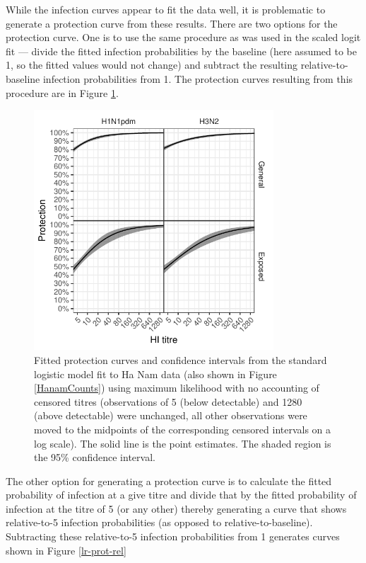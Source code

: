 \documentclass[12pt]{article}
\begin{document}
\pagebreak

While the infection curves appear to fit the data well, it is problematic to generate a protection curve from these results. There are two options for the protection curve. One is to use the same procedure as was used in the scaled logit fit --- divide the fitted infection probabilities by the baseline (here assumed to be 1, so the fitted values would not change) and subtract the resulting relative-to-baseline infection probabilities from 1. The protection curves resulting from this procedure are in Figure \ref{lr-prot-abs}.

\begin{figure}[htp]
	\centering
	\includegraphics[width=0.8\textwidth]{../fit-logistic-plot/hanam-hi-prot.pdf}
	\caption{
	Fitted protection curves and confidence intervals from the standard logistic model fit to Ha Nam data (also shown in Figure \ref{HanamCounts}) using maximum likelihood with no accounting of censored titres (observations of 5 (below detectable) and 1280 (above detectable) were unchanged, all other observations were moved to the midpoints of the corresponding censored intervals on a log scale). The solid line is the point estimates. The shaded region is the 95\% confidence interval.
	}
	\label{lr-prot-abs}
\end{figure}

The other option for generating a protection curve is to calculate the fitted probability of infection at a give titre and divide that by the fitted probability of infection at the titre of 5 (or any other) thereby generating a curve that shows relative-to-5 infection probabilities (as opposed to relative-to-baseline). Subtracting these relative-to-5 infection probabilities from 1 generates curves shown in Figure \ref{lr-prot-rel}
\end{document}

